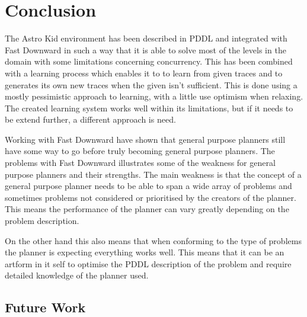 \chapter{Conclusion}

The Astro Kid environment has been described in PDDL and integrated with Fast Downward in such a way that it is able to solve most of the levels in the domain with some limitations concerning concurrency. This has been combined with a learning process which enables it to to learn from given traces and to generates its own new traces when the given isn't sufficient. This is done using a mostly pessimistic approach to learning, with a little use optimism when relaxing. The created learning system works well within its limitations, but if it needs to be extend further, a different approach is need.


Working with Fast Downward have shown that general purpose planners still have some way to go before truly becoming general purpose planners. The problems with Fast Downward illustrates some of the weakness for general purpose planners and their strengths. The main weakness is that the concept of a general purpose planner needs to be able to span a wide array of problems and sometimes problems not considered or prioritised by the creators of the planner. This means the performance of the planner can vary greatly depending on the problem description.

 
On the other hand this also means that when conforming to the type of problems the planner is expecting everything works well. This means that it can be an artform in it self to optimise the PDDL description of the problem and require detailed knowledge of the planner used.
 
 
 
 

 
 
\section{Future Work}

